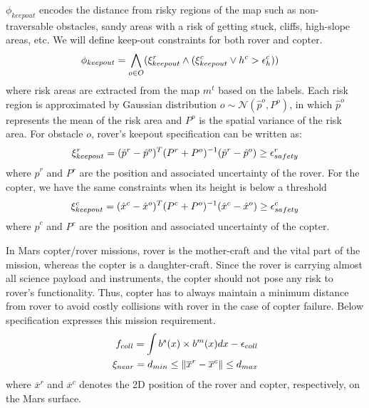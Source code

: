 \documentclass[conference]{IEEEtran}
\begin{document}
	\noindent{}
	$\phi_{keepout}$ encodes the distance from risky regions of the map such as non-traversable obstacles, sandy areas with a risk of getting stuck, cliffs, high-slope areas, etc. We will define keep-out constraints for both rover and copter.
	\begin{align}
	   \phi_{keepout} &= \bigwedge_{o\in O} (\xi_{keepout}^r \land (\xi_{keepout}^c \lor h^c > \epsilon_{h}^c))
	\end{align}
	where risk areas are extracted from the map $m^t$ based on the labels. Each risk region is approximated by Gaussian distribution $o \sim\mathcal{N}(\hat{p}^o, P^o)$, in which $\hat{p}^o$ represents the mean of the risk area and $P^o$ is the spatial variance of the risk area. For obstacle $o$, rover's keepout specification can be written as:
	\begin{align}
    	\xi_{keepout}^r = (\hat{p}^r-\hat{p}^o)^T(P^r+P^o)^{-1}(\hat{p}^r-\hat{p}^o) \geq \epsilon_{safety}^r
	\end{align}
	where $\hat{p}^r$ and $P^r$ are the position and associated uncertainty of the rover. For the copter, we have the same constraints when its height is below a threshold
	\begin{align}
    	\xi_{keepout}^c = (\hat{x}^c-\hat{x}^o)^T(P^c+P^o)^{-1}(\hat{x}^c-\hat{x}^o) \geq \epsilon_{safety}^c
	\end{align}
	where $\hat{p}^c$ and $P^c$ are the position and associated uncertainty of the copter.
    
\noindent{} In Mars copter/rover missions, rover is the mother-craft and the vital part of the mission, whereas the copter is a daughter-craft. Since the rover is carrying almost all science payload and instruments, the copter should not pose any risk to rover's functionality. Thus, copter has to always maintain a minimum distance from rover to avoid costly collisions with rover in the case of copter failure. Below specification expresses this mission requirement.
 	\begin{align}
 	    f_{coll} = \int b^{s}(x)\times b^{m}(x)dx - \epsilon_{coll} \\
 	    \xi_{near} = d_{min} \leq \left\| {\overline{x}^r - \overline{x}^c} \right\| \leq d_{max}
 	\end{align}
    where $\overline{x}^r$ and $\overline{x}^c$ denotes the 2D position of the rover and copter, respectively, on the Mars surface.
\end{document}
